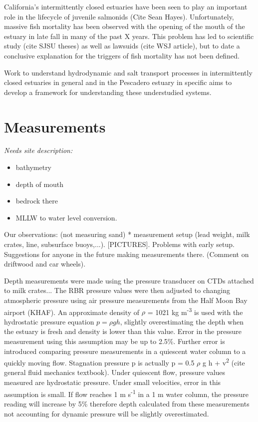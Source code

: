 California's intermittently closed estuaries have been seen to play an important role in the lifecycle of juvenile salmonids (Cite Sean Hayes). Unfortunately, massive fish mortality has been observed with the opening of the mouth of the estuary in late fall in many of the past X years. This problem has led to scientific study (cite SJSU theses) as well as lawsuids (cite WSJ article), but to date a conclusive explanation for the triggers of fish mortality has not been defined. 

Work to understand hydrodynamic and salt transport processes in intermittently closed estuaries in general and in the Pescadero estuary in specific aims to develop a framework for understanding these understudied systems. 

\section{Measurements} \label{measurementslabel}

\emph{Needs site description:}
\begin{itemize}
\item bathymetry \item depth of mouth \item bedrock there \item MLLW to water level
conversion. \end{itemize}

Our observations: (not measuring sand) * measurement setup (lead weight,
milk crates, line, subsurface buoys,...). [PICTURES]. Problems with
early setup. Suggestions for anyone in the future making measurements
there. (Comment on driftwood and car wheels).

Depth measurements were made using the pressure transducer on CTDs
attached to milk crates... The RBR pressure values were then adjusted to
changing atmospheric pressure using air pressure measurements from the
Half Moon Bay airport (KHAF). An approximate density of $\rho$ = 1021 kg
m\textsuperscript{-3} is used with the hydrostatic pressure equation ${p
= \rho g h}$, slightly overestimating the depth when the estuary is
fresh and density is lower than this value. Error in the pressure
measurement using this assumption may be up to 2.5\%. Further error is
introduced comparing pressure measurements in a quiescent water column
to a quickly moving flow. Stagnation pressure p is actually p = 0.5
$\rho$ g h +  v\textsuperscript{2} (cite general fluid mechanics
textbook). Under quiescent flow, pressure values measured are
hydrostatic pressure. Under small velocities, error in this assumption
is small. If flow reaches 1 m s\textsuperscript{-1} in a 1 m water
column, the pressure reading will increase by 5\% therefore depth
calculated from these measurements not accounting for dynamic pressure
will be slightly overestimated.

